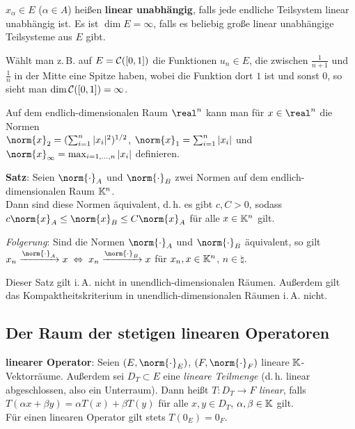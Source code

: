 $x_\alpha \in E$ ($\alpha \in A$) heißen \textbf{linear unabhängig}, falls
jede endliche Teilsystem linear unabhängig ist.
Es ist $\dim E = \infty$, falls es beliebig große linear unabhängige
Teilsysteme aus $E$ gibt.

Wählt man z.\,B. auf $E = \mathcal{C}([0,1])$ die Funktionen $u_n \in E$, die
zwischen $\frac{1}{n + 1}$ und $\frac{1}{n}$ in der Mitte eine Spitze haben,
wobei die Funktion dort $1$ ist und sonst $0$, so sieht man
$\dim \mathcal{C}([0,1]) = \infty$.

\linie

Auf dem endlich-dimensionalen Raum $\real^n$ kann man für $x \in \real^n$
die Normen \\
$\norm{x}_2 = (\sum_{i=1}^n |x_i|^2)^{1/2}$, \quad
$\norm{x}_1 = \sum_{i=1}^n |x_i|$ \; und \;
$\norm{x}_\infty = \max_{i = 1, \dotsc, n} |x_i|$ definieren.

\textbf{Satz}:
Seien $\norm{\cdot}_A$ und $\norm{\cdot}_B$ zwei Normen auf dem
endlich-dimensionalen Raum $\mathbb{K}^n$. \\
Dann sind diese Normen äquivalent, d.\,h. es gibt $c, C > 0$, sodass
$c \norm{x}_A \le \norm{x}_B \le C \norm{x}_A$ für alle $x \in \mathbb{K}^n$ gilt.

\emph{Folgerung}:
Sind die Normen $\norm{\cdot}_A$ und $\norm{\cdot}_B$ äquivalent, so gilt
$x_n \xrightarrow{\norm{\cdot}_A} x \;\Leftrightarrow\;
x_n \xrightarrow{\norm{\cdot}_B} x$ für $x_n, x \in \mathbb{K}^n$,
$n \in \natural$.

Dieser Satz gilt i.\,A. nicht in unendlich-dimensionalen Räumen.
Außerdem gilt das Kompaktheitskriterium in unendlich-dimensionalen
Räumen i.\,A. nicht.

\pagebreak

\subsection{%
    Der Raum der stetigen linearen Operatoren%
}

\textbf{linearer Operator}:
Seien $(E, \norm{\cdot}_E)$, $(F, \norm{\cdot}_F)$ lineare
$\mathbb{K}$-Vektorräume.
Außerdem sei $D_T \subset E$ eine \emph{lineare Teilmenge}
(d.\,h. linear abgeschlossen, also ein Unterraum).
Dann heißt $T: D_T \rightarrow F$ \emph{linear}, falls
$T(\alpha x + \beta y) = \alpha T(x) + \beta T(y)$ für alle
$x, y \in D_T$, $\alpha, \beta \in \mathbb{K}$ gilt. \\
Für einen linearen Operator gilt stets $T(0_E) = 0_F$.

\linie

